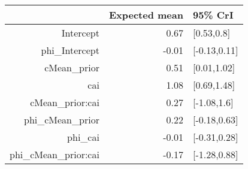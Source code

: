 \begin{tabular}{rrl}
  \hline
 & Expected mean & 95\% CrI \\ 
  \hline
Intercept & 0.67 & [0.53,0.8] \\ 
  phi\_Intercept & -0.01 & [-0.13,0.11] \\ 
  cMean\_prior & 0.51 & [0.01,1.02] \\ 
  cai & 1.08 & [0.69,1.48] \\ 
  cMean\_prior:cai & 0.27 & [-1.08,1.6] \\ 
  phi\_cMean\_prior & 0.22 & [-0.18,0.63] \\ 
  phi\_cai & -0.01 & [-0.31,0.28] \\ 
  phi\_cMean\_prior:cai & -0.17 & [-1.28,0.88] \\ 
   \hline
\end{tabular}

